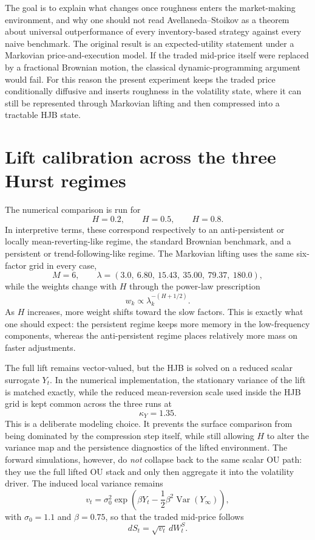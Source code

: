 \documentclass[a4paper,10pt,titlepage,oneside,openany]{book}
\theoremstyle{plain}
\theoremstyle{definition}
\theoremstyle{remark}
\newcommand{\Var}{\operatorname{Var}}
\newcommand{\1}{\mathbf{1}}
\begin{document}
The goal is to explain what changes once roughness enters the market-making environment, and why one should not read Avellaneda--Stoikov as a theorem about universal outperformance of every inventory-based strategy against every naive benchmark. The original result is an expected-utility statement under a Markovian price-and-execution model. If the traded mid-price itself were replaced by a fractional Brownian motion, the classical dynamic-programming argument would fail. For this reason the present experiment keeps the traded price conditionally diffusive and inserts roughness in the volatility state, where it can still be represented through Markovian lifting and then compressed into a tractable HJB state.

\section{Lift calibration across the three Hurst regimes}

The numerical comparison is run for
\[
H=0.2,\qquad H=0.5,\qquad H=0.8.
\]
In interpretive terms, these correspond respectively to an anti-persistent or locally mean-reverting-like regime, the standard Brownian benchmark, and a persistent or trend-following-like regime. The Markovian lifting uses the same six-factor grid in every case,
\[
M=6,
\qquad
\lambda=(3.0,\ 6.80,\ 15.43,\ 35.00,\ 79.37,\ 180.0),
\]
while the weights change with \(H\) through the power-law prescription
\[
w_k \propto \lambda_k^{-(H+1/2)}.
\]
As \(H\) increases, more weight shifts toward the slow factors. This is exactly what one should expect: the persistent regime keeps more memory in the low-frequency components, whereas the anti-persistent regime places relatively more mass on faster adjustments.

The full lift remains vector-valued, but the HJB is solved on a reduced scalar surrogate \(Y_t\). In the numerical implementation, the stationary variance of the lift is matched exactly, while the reduced mean-reversion scale used inside the HJB grid is kept common across the three runs at
\[
\kappa_Y=1.35.
\]
This is a deliberate modeling choice. It prevents the surface comparison from being dominated by the compression step itself, while still allowing \(H\) to alter the variance map and the persistence diagnostics of the lifted environment. The forward simulations, however, do \emph{not} collapse back to the same scalar OU path: they use the full lifted OU stack and only then aggregate it into the volatility driver. The induced local variance remains
\[
v_t
=
\sigma_0^2
\exp\!\left(
\beta Y_t
-\frac12\beta^2\Var(Y_\infty)
\right),
\]
with \(\sigma_0=1.1\) and \(\beta=0.75\), so that the traded mid-price follows
\[
dS_t=\sqrt{v_t}\,dW_t^S.
\]
\end{document}
